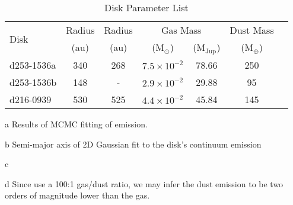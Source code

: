 \begin{table}[ht!]
  \centering
  \begin{threeparttable}
    \caption{Disk Parameter List}
    \label{table:disk_masses_rads}
    \renewcommand{\arraystretch}{1.2}
    \begin{tabular}{l c c c c c c}
      \toprule \toprule
      \multirow{2}{*}{Disk}  & Radius\tnote{a} & Radius\tnote{b} & \multicolumn{2}{c}{Gas Mass\tnote{c}} &  Dust Mass\tnote{d} \\
                             & (au)            & (au)            & (M$_\odot$)       & (M$_\text{Jup}$)  & (M$_\oplus$)  \\
      \midrule %
      d253-1536a             & 340             & 268             & $7.5 \times 10^{-2}$        & 78.66   & 250   \\
      d253-1536b             & 148             &  -              & $2.9 \times 10^{-2}$        & 29.88   & 95    \\
      d216-0939              & 530             & 525             & $4.4 \times 10^{-2}$        & 45.84   & 145   \\
      \bottomrule
    \end{tabular}
    \begin{tablenotes}\footnotesize
      \item[a] Results of MCMC fitting of \hco emission.
      \item[b] Semi-major axis of 2D Gaussian fit to the disk's continuum emission \citep{Mann2014}
      \item[c] \citet{Williams2014}
      \item[d] Since \citet{Williams2014} use a 100:1 gas/dust ratio, we may infer the dust emission to be two orders of magnitude lower than the gas.
    \end{tablenotes}
  \end{threeparttable}
\end{table}



